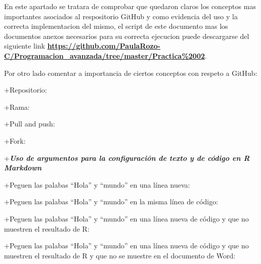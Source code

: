 \documentclass[
]{article}
\begin{document}
En este apartado se tratara de comprobar que quedaron claros los
conceptos mas importantes asociados al respositorio GitHub y como
evidencia del uso y la correcta implementacion del mismo, el script de
este documento mas los documentos anexos necesarios para su correcta
ejecucion puede descargarse del siguiente link
\textbf{\url{https://github.com/PaulaRozo-C/Programacion_avanzada/tree/master/Practica\%2002}}.

Por otro lado comentar a importancia de ciertos conceptos con respeto a
GitHub:

+Repositorio:

+Rama:

+Pull and push:

+Fork:

+\textbf{\emph{Uso de argumentos para la configuración de texto y de
código en R Markdown}}

+Peguen las palabas ``Hola'' y ``mundo'' en una línea nueva:

+Peguen las palabas ``Hola'' y ``mundo'' en la misma línea de código:

+Peguen las palabas ``Hola'' y ``mundo'' en una línea nueva de código y
que no muestren el resultado de R:

+Peguen las palabas ``Hola'' y ``mundo'' en una línea nueva de código y
que no muestren el resultado de R y que no se muestre en el documento de
Word:
\end{document}
